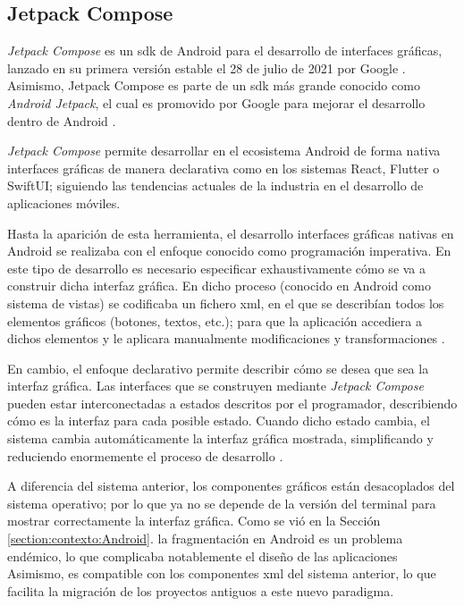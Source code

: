     \subsection{Jetpack Compose}

        \textit{Jetpack Compose} es un \gls{sdk} de Android para el desarrollo de interfaces gráficas, lanzado en su primera versión estable el 28 de julio de 2021 por Google \cite{bellini_jetpack_2021}. Asimismo, Jetpack Compose es parte de un \gls{sdk} más grande conocido como \textit{Android Jetpack}, el cual es promovido por Google para mejorar el desarrollo dentro de Android \cite{huaman_que_2018} \cite{android_developers_recursos_nodate}. 
        
        \textit{Jetpack Compose} permite desarrollar en el ecosistema Android de forma nativa interfaces gráficas de manera declarativa como en los sistemas React, Flutter o SwiftUI; siguiendo las tendencias actuales de la industria en el desarrollo de aplicaciones móviles. 

        Hasta la aparición de esta herramienta, el desarrollo interfaces gráficas nativas en Android se realizaba con el enfoque conocido como programación imperativa. En este tipo de desarrollo es necesario especificar exhaustivamente cómo se va a construir dicha interfaz gráfica. En dicho proceso (conocido en Android como sistema de vistas) se codificaba un fichero \gls{xml}, en el que se describían todos los elementos gráficos (botones, textos, etc.); para que la aplicación accediera a dichos elementos y le aplicara manualmente modificaciones y transformaciones \cite{deloitte_spain_programacion_2021}. 

        En cambio, el enfoque declarativo permite describir cómo se desea que sea la interfaz gráfica. Las interfaces que se construyen mediante \textit{Jetpack Compose} pueden estar interconectadas a estados descritos por el programador, describiendo cómo es la interfaz para cada posible estado. Cuando dicho estado cambia, el sistema cambia automáticamente la interfaz gráfica mostrada, simplificando y reduciendo enormemente el proceso de desarrollo \cite{leiva_que_2021}. 

        A diferencia del sistema anterior, los componentes gráficos están desacoplados 
        del sistema operativo; por lo que ya no se depende de la versión del terminal para mostrar correctamente la interfaz gráfica. Como se vió en la Sección 
        \ref{section:contexto:Android}. la fragmentación en Android es un 
        problema endémico, lo que complicaba notablemente el diseño de las aplicaciones Asimismo, es compatible con los componentes \gls{xml} del sistema anterior, lo que facilita la migración de los proyectos antiguos a este nuevo paradigma. 

